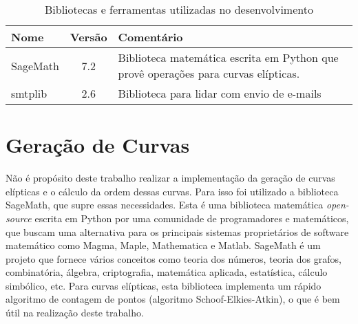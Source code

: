 %
%
%
\begin{table}[!ht]
\centering
\caption{Bibliotecas e ferramentas utilizadas no desenvolvimento}
    \begin{tabularx}{0.95\textwidth}{lcX}

    \toprule
        \textbf{Nome}  &  \textbf{Versão}  &  \textbf{Comentário}  \\
    \midrule
        SageMath & 7.2 & Biblioteca matemática escrita em Python que provê operações para curvas elípticas.  \\
        \rowcolor[gray]{0.9}
        smtplib  & 2.6  & Biblioteca para lidar com envio de e-mails                                         \\
    \bottomrule

    \end{tabularx}
\label{table:libs}

\end{table}

%
%
\section{Geração de Curvas}
Não é propósito deste trabalho realizar a implementação da geração de curvas elípticas e o cálculo da ordem dessas curvas. Para isso foi utilizado a biblioteca SageMath, que supre essas necessidades. Esta é uma biblioteca matemática \textit{open-source} escrita em Python por uma comunidade de programadores e matemáticos, que buscam uma alternativa para os principais sistemas proprietários de software matemático como Magma, Maple, Mathematica e Matlab. SageMath é um projeto que fornece vários conceitos como teoria dos números, teoria dos grafos, combinatória, álgebra, criptografia, matemática aplicada, estatística, cálculo simbólico, etc. Para curvas elípticas, esta biblioteca implementa um rápido algoritmo de contagem de pontos (algoritmo Schoof-Elkies-Atkin), o que é bem útil na realização deste trabalho.
